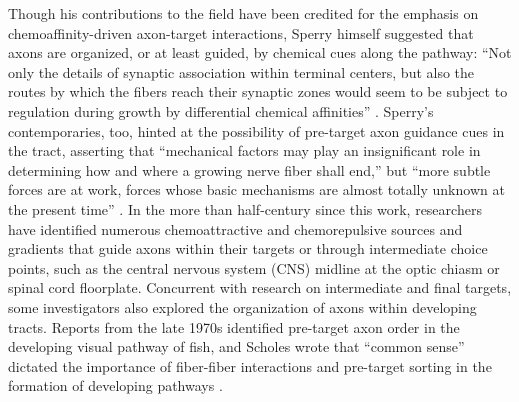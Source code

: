 Though his contributions to the field have been credited for the emphasis on chemoaffinity-driven axon-target interactions, Sperry himself suggested that axons are organized, or at least guided, by chemical cues along the pathway: ``Not only the details of synaptic association within terminal centers, but also the routes by which the fibers reach their synaptic zones would seem to be subject to regulation during growth by differential chemical affinities'' \cite{attardi1963preferential}.
Sperry's contemporaries, too, hinted at the possibility of pre-target axon guidance cues in the tract, asserting that ``mechanical factors may play an insignificant role in determining how and where a growing nerve fiber shall end,'' but ``more subtle forces are at work, forces whose basic mechanisms are almost totally unknown at the present time'' \cite{barnard1956study}.
In the more than half-century since this work, researchers have identified numerous chemoattractive and chemorepulsive sources and gradients that guide axons within their targets or through intermediate choice points, such as the central nervous system (CNS) midline at the optic chiasm or spinal cord floorplate.
Concurrent with research on intermediate and final targets, some investigators also explored the organization of axons within developing tracts.
Reports from the late 1970s identified pre-target axon order in the developing visual pathway of fish, and Scholes wrote that ``common sense'' dictated the importance of fiber-fiber interactions and pre-target sorting in the formation of developing pathways \cite{cook1977multiple,scholes1979nerve}.
